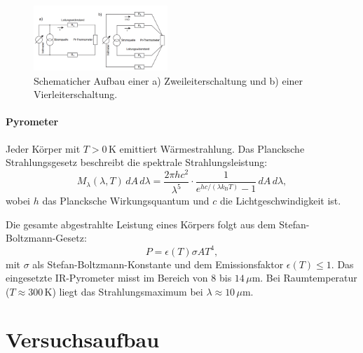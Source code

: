 \begin{figure}[h!]
    \centering
    \includegraphics[width=0.45\textwidth]{img/41/zwei_vier-Leiter.png}
    \caption{Schematicher Aufbau einer a) Zweileiterschaltung und b) einer Vierleiterschaltung.}
\end{figure}

\paragraph{Pyrometer}
Jeder Körper mit $T > 0\,$K emittiert Wärmestrahlung. Das Plancksche Strahlungsgesetz beschreibt die spektrale Strahlungsleistung:
\begin{equation}
    M_\lambda(\lambda,T)\,dA\,d\lambda = \frac{2\pi h c^2}{\lambda^5} \cdot \frac{1}{e^{hc/(\lambda k_{\mathrm{B}}T)} - 1} \, dA\,d\lambda,
\end{equation}
wobei $h$ das Plancksche Wirkungsquantum und $c$ die Lichtgeschwindigkeit ist.  

Die gesamte abgestrahlte Leistung eines Körpers folgt aus dem Stefan-Boltzmann-Gesetz:
\begin{equation}
    P = \epsilon(T) \sigma A T^4,
\end{equation}
mit $\sigma$ als Stefan-Boltzmann-Konstante und dem Emissionsfaktor $\epsilon(T) \leq 1$.  
Das eingesetzte IR-Pyrometer misst im Bereich von $8$ bis $14\,\mu$m. Bei Raumtemperatur ($T \approx 300\,$K) liegt das Strahlungsmaximum bei $\lambda \approx 10\,\mu$m.

\section{Versuchsaufbau}